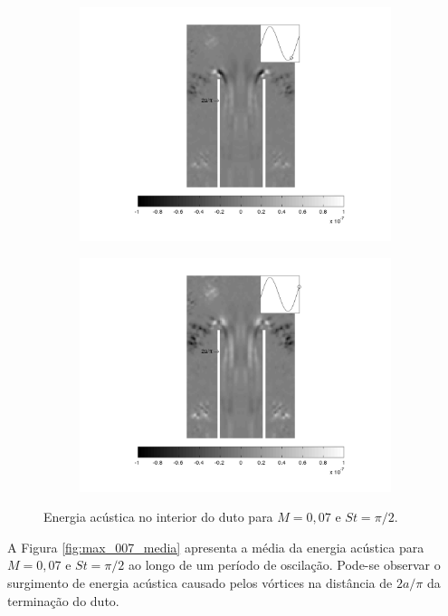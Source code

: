 \begin{landscape}
\begin{figure}[ht!]
\begin{subfigure}{0.55 \textwidth}
  \includegraphics[width=1.\linewidth]{figuras/min_ka_007_5.png}
  \caption[]{}
  \label{fig:min_007_5}
\end{subfigure}
\begin{subfigure}{0.55 \textwidth}
  \includegraphics[width=1.\linewidth]{figuras/min_ka_007_6.png}
  \caption[]{}
  \label{fig:min_007_6}
\end{subfigure}
\caption[Energia acústica para $M = 0,07$ e $St = \pi/2$.]{Energia acústica no interior do duto para $M = 0,07$ e $St = \pi/2$.}\label{fig:min_007}
\end{figure}
\vfill
\clearpage
\end{landscape}


A Figura \ref{fig:max_007_media} apresenta a média da energia acústica para $M = 0,07$ e $St = \pi/2$ ao longo de um período de oscilação. Pode-se observar o surgimento de energia acústica causado pelos vórtices na distância de $2a/\pi$ da terminação do duto.

